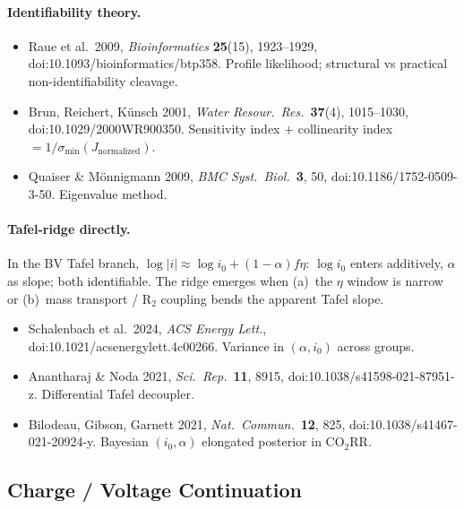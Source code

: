 \documentclass[11pt]{article}
\begin{document}
\paragraph{Identifiability theory.}
\begin{itemize}
\item Raue et al.\ 2009, \emph{Bioinformatics} \textbf{25}(15), 1923--1929,
      doi:10.1093/bioinformatics/btp358. Profile likelihood; structural vs
      practical non-identifiability cleavage.
\item Brun, Reichert, K\"unsch 2001, \emph{Water Resour.~Res.}\
      \textbf{37}(4), 1015--1030, doi:10.1029/2000WR900350. Sensitivity index
      $+$ collinearity index $=1/\sigma_{\min}(J_{\mathrm{normalized}})$.
\item Quaiser \& M\"onnigmann 2009, \emph{BMC Syst.~Biol.}\ \textbf{3}, 50,
      doi:10.1186/1752-0509-3-50. Eigenvalue method.
\end{itemize}

\paragraph{Tafel-ridge directly.}
In the BV Tafel branch, $\log|i|\approx \log i_0 + (1-\alpha) f \eta$:
$\log i_0$ enters additively, $\alpha$ as slope; both identifiable. The ridge
emerges when (a)~the $\eta$ window is narrow or (b)~mass transport /
$\mathrm{R}_2$ coupling bends the apparent Tafel slope.
\begin{itemize}
\item Schalenbach et al.\ 2024, \emph{ACS Energy Lett.},
      doi:10.1021/acsenergylett.4c00266. Variance in $(\alpha,i_0)$ across
      groups.
\item Anantharaj \& Noda 2021, \emph{Sci.~Rep.}\ \textbf{11}, 8915,
      doi:10.1038/s41598-021-87951-z. Differential Tafel decoupler.
\item Bilodeau, Gibson, Garnett 2021, \emph{Nat.~Commun.}\ \textbf{12}, 825,
      doi:10.1038/s41467-021-20924-y. Bayesian $(i_0,\alpha)$ elongated
      posterior in $\mathrm{CO}_2\mathrm{RR}$.
\end{itemize}

\subsection{Charge / Voltage Continuation}
\end{document}
